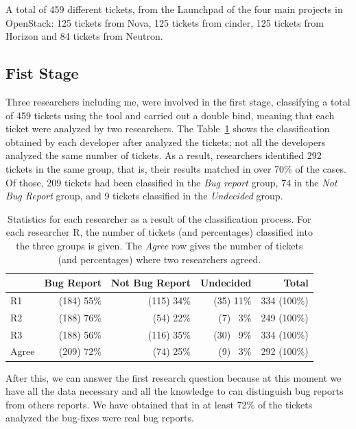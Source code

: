 \documentclass[ifip]{svmult}
\begin{document}
A total of 459 different tickets, from the Launchpad of the four main projects in OpenStack: 125 tickets from Nova, 125 tickets from cinder, 125 tickets from Horizon and 84 tickets from Neutron.

\subsection{Fist Stage}
\label{sec:resultsFS}

Three researchers including me, were involved in the first stage, classifying a total of 459 tickets using the tool and carried out a double bind, meaning that each ticket were analyzed by two researchers. The Table~\ref{tab:2} shows the classification obtained by each developer after analyzed the tickets; not all the developers analyzed the same number of tickets. As a result, researchers identified 292 tickets in the same group, that is, their results matched in over 70\% of the cases. Of those, 209 tickets had been classified in the \emph{Bug report} group, 74 in the \emph{Not Bug Report} group, and 9 tickets classified in the \emph{Undecided} group.

\begin{table}
\centering
\begin{tabular}{l|rrr|r}
\toprule[0.3mm]%
  & Bug Report & Not Bug Report & Undecided & Total \\\hline
R1  & (184) 55\% & (115) 34\% & (35) 11\% & 334 (100\%) \\
R2  & (188) 76\% & (54) 22\% & (7) ~3\% & 249 (100\%) \\
R3 & (188) 56\% & (116) 35\% & (30) ~9\% & 334 (100\%) \\ \hline
Agree & (209) 72\% & (74) 25\% & (9) ~3\% & 292 (100\%) \\
\bottomrule[0.3mm]
\end{tabular} %
\caption{Statistics for each researcher as a result of the classification process. For each researcher R, the number of tickets (and percentages) classified into the three groups is given. The \emph{Agree} row gives the number of tickets (and percentages) where two researchers agreed.}
\label{tab:2}
\end{table}


After this, we can answer the first research question because at this moment we have all the data necessary and all the knowledge to can distinguish bug reports from others reports. We have obtained that in at least 72\% of the tickets analyzed the bug-fixes were real bug reports.
\end{document}
